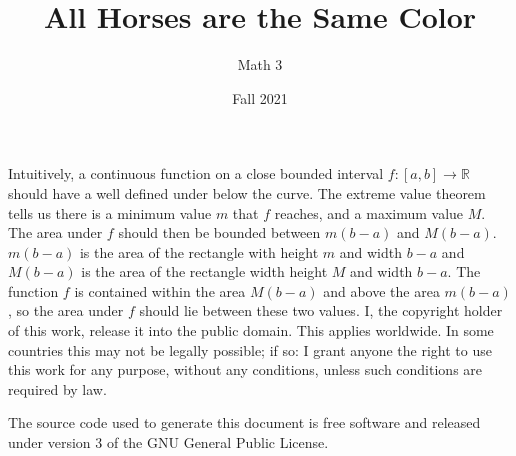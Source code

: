 \documentclass{article}
\title{All Horses are the Same Color}
\author{Math 3}
\date{Fall 2021}
\theoremstyle{normal}
\theoremstyle{plain}
\begin{document}
    \maketitle
    Intuitively, a continuous function on a close bounded interval
    $f:[a,b]\rightarrow\mathbb{R}$ should have a well defined under below
    the curve. The extreme value theorem tells us there is a minimum value
    $m$ that $f$ reaches, and a maximum value $M$. The area under $f$ should
    then be bounded between $m(b-a)$ and $M(b-a)$. $m(b-a)$ is the area of the
    rectangle with height $m$ and width $b-a$ and $M(b-a)$ is the area of the
    rectangle width height $M$ and width $b-a$. The function $f$ is contained
    within the area $M(b-a)$ and above the area $m(b-a)$, so the area under
    $f$ should lie between these two values.
    \newpage
    I, the copyright holder of this work, release it into the public domain.
    This applies worldwide. In some countries this may not be legally possible;
    if so: I grant anyone the right to use this work for any purpose, without
    any conditions, unless such conditions are required by law.
    \par\hfill\par
    The source code used to generate this document is free software and released
    under version 3 of the GNU General Public License.
\end{document}
